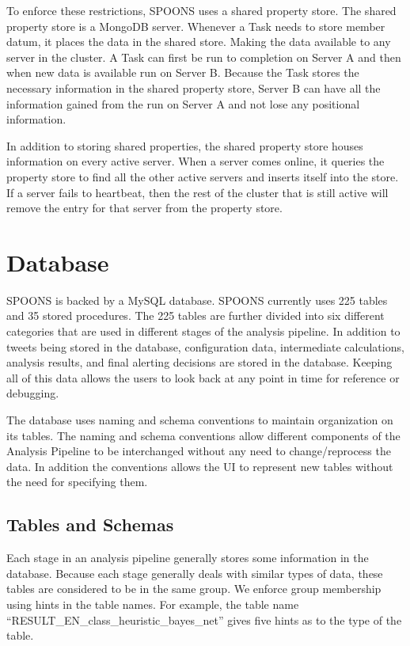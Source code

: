 \documentclass[12pt]{ucthesis}
\begin{document}
To enforce these restrictions, SPOONS uses a shared property store. The shared property store is a MongoDB server.
Whenever a Task needs to store member datum, it places the data in the shared store. Making the data available to any server in the cluster.
A Task can first be run to completion on Server A and then when new data is available run on Server B.
Because the Task stores the necessary information in the shared property store,
Server B can have all the information gained from the run on Server A and not lose any positional information.

In addition to storing shared properties, the shared property store houses information on every active server.
When a server comes online, it queries the property store to find all the other active servers and inserts itself into
the store. If a server fails to heartbeat, then the rest of the cluster that is still active will remove the entry for that server from the property store.

\chapter{Database}
\label{arch-database}
SPOONS is backed by a MySQL database. SPOONS currently uses 225 tables and 35 stored procedures. The 225 tables are further divided into
six different categories that are used in different stages of the analysis pipeline. In addition to tweets being stored in the database,
configuration data, intermediate calculations, analysis results, and final alerting decisions are stored in the database. Keeping all of this
data allows the users to look back at any point in time for reference or debugging.

The database uses naming and schema conventions to maintain organization on its tables. The naming and schema conventions allow different
components of the Analysis Pipeline to be interchanged without any need to change/reprocess the data. In addition the conventions allows the UI
to represent new tables without the need for specifying them.

\section{Tables and Schemas}
\label{arch-database-tables}
Each stage in an analysis pipeline generally stores some information in the database. Because each stage generally deals with similar
types of data, these tables are considered to be in the same group. We enforce group membership using hints in the table names. For example, the
table name ``RESULT\_EN\_class\_heuristic\_bayes\_net''
gives five hints as to the type of the table.
\end{document}
